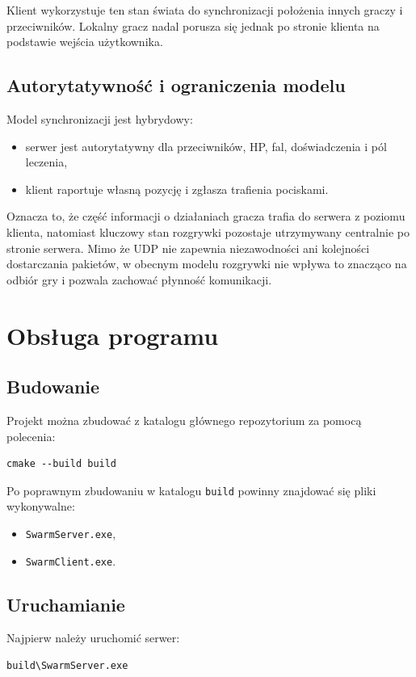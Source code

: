 \documentclass[a4paper,12pt]{article}
\begin{document}
Klient wykorzystuje ten stan świata do synchronizacji położenia innych graczy i przeciwników. Lokalny gracz nadal porusza się jednak po stronie klienta na podstawie wejścia użytkownika.

\subsection{Autorytatywność i ograniczenia modelu}
Model synchronizacji jest hybrydowy:
\begin{itemize}[leftmargin=1.5cm]
    \item serwer jest autorytatywny dla przeciwników, HP, fal, doświadczenia i pól leczenia,
    \item klient raportuje własną pozycję i zgłasza trafienia pociskami.
\end{itemize}

Oznacza to, że część informacji o działaniach gracza trafia do serwera z poziomu klienta, natomiast kluczowy stan rozgrywki pozostaje utrzymywany centralnie po stronie serwera. Mimo że UDP nie zapewnia niezawodności ani kolejności dostarczania pakietów, w obecnym modelu rozgrywki nie wpływa to znacząco na odbiór gry i pozwala zachować płynność komunikacji.

\section{Obsługa programu}
\subsection{Budowanie}
Projekt można zbudować z katalogu głównego repozytorium za pomocą polecenia:
\begin{verbatim}
cmake --build build
\end{verbatim}

Po poprawnym zbudowaniu w katalogu \texttt{build} powinny znajdować się pliki wykonywalne:
\begin{itemize}[leftmargin=1.5cm]
    \item \texttt{SwarmServer.exe},
    \item \texttt{SwarmClient.exe}.
\end{itemize}

\subsection{Uruchamianie}
Najpierw należy uruchomić serwer:
\begin{verbatim}
build\SwarmServer.exe
\end{verbatim}
\end{document}
